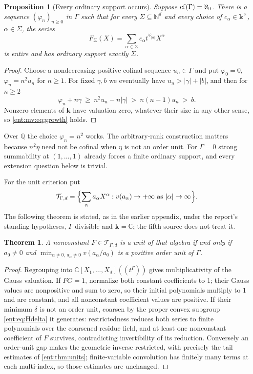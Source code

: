 \documentclass[11pt]{article}
\newtheorem{theorem}{Theorem}[section]
\theoremstyle{plain}
\theoremstyle{plain}
\newtheorem{proposition}[proposition]{Proposition}
\theoremstyle{plain}
\theoremstyle{definition}
\theoremstyle{definition}
\theoremstyle{definition}
\theoremstyle{definition}
\theoremstyle{remark}
\newcommand{\C}{\mathbb C}\newcommand{\R}{\mathbb R}
\newcommand{\Q}{\mathbb Q}\newcommand{\Z}{\mathbb Z}\newcommand{\N}{\mathbb N}
\newcommand{\kk}{\mathbf k}\newcommand{\PP}{\mathbb P}
\begin{document}
\begin{proposition}[Every ordinary support occurs]
\label{ent:mv:prop:realize-support}
Suppose $\operatorname{cf}(\Gamma)=\aleph_0$. There is a sequence $(\varphi_n)_{n\ge0}$ in
$\Gamma$ such that for every $\Sigma\subseteq\N^d$ and every choice of
$c_\alpha\in\kk^\times$, $\alpha\in\Sigma$, the series
\[
 F_\Sigma(X)=\sum_{\alpha\in\Sigma}c_\alpha t^{\varphi_{|\alpha|}}X^\alpha
\]
is entire and has ordinary support exactly $\Sigma$.
\end{proposition}
\begin{proof}
Choose a nondecreasing positive cofinal sequence $u_n\in\Gamma$ and put
$\varphi_0=0$, $\varphi_n=n^2u_n$ for $n\ge1$. For fixed $\gamma,b$ we
eventually have $u_n>|\gamma|+|b|$, and then for $n\ge2$
\[
 \varphi_n+n\gamma\ \ge\ n^2u_n-n|\gamma|\ >\ n(n-1)u_n\ >\ b .
\]
Nonzero elements of $\kk$ have valuation zero, whatever their size in any
other sense, so \eqref{ent:mv:eq:growth} holds.
\end{proof}

Over $\Q$ the choice $\varphi_n=n^2$ works. The arbitrary-rank construction
matters because $n^2\eta$ need not be cofinal when $\eta$ is not an order
unit. For $\Gamma=0$ strong summability at $(1,\ldots,1)$ already forces a
finite ordinary support, and every extension question below is trivial.

For the unit criterion put
\[
 \mathcal T_{\Gamma,d}
 =\Bigl\{\sum_\alpha a_\alpha X^\alpha:
              v(a_\alpha)\to+\infty\text{ as }|\alpha|\to\infty\Bigr\}.
\]
The following theorem is stated, as in the earlier appendix, under the
report's standing hypotheses, $\Gamma$ divisible and $\kk=\C$; the fifth
source does not treat it.

\begin{theorem}\label{ent:thm:multi-unit}
A nonconstant $F\in\mathcal T_{\Gamma,d}$ is a unit of that algebra if and
only if $a_0\ne0$ and
$\min_{\alpha\ne0,\ a_\alpha\ne0}v(a_\alpha/a_0)$ is a positive order unit of
$\Gamma$.
\end{theorem}
\begin{proof}
Regrouping into $\C[X_1,\ldots,X_d]((t^\Gamma))$ gives multiplicativity of
the Gauss valuation. If $FG=1$, normalize both constant coefficients to $1$;
their Gauss values are nonpositive and sum to zero, so their initial
polynomials multiply to $1$ and are constant, and all nonconstant coefficient
values are positive. If their minimum $\delta$ is not an order unit, coarsen
by the proper convex subgroup \eqref{ent:eq:Hdelta} it generates:
restrictedness reduces both series to finite polynomials over the coarsened
residue field, and at least one nonconstant coefficient of $F$ survives,
contradicting invertibility of its reduction. Conversely an order-unit gap
makes the geometric inverse restricted, with precisely the tail estimates of
\cref{ent:thm:units}; finite-variable convolution has finitely many terms at
each multi-index, so those estimates are unchanged.
\end{proof}
\end{document}

